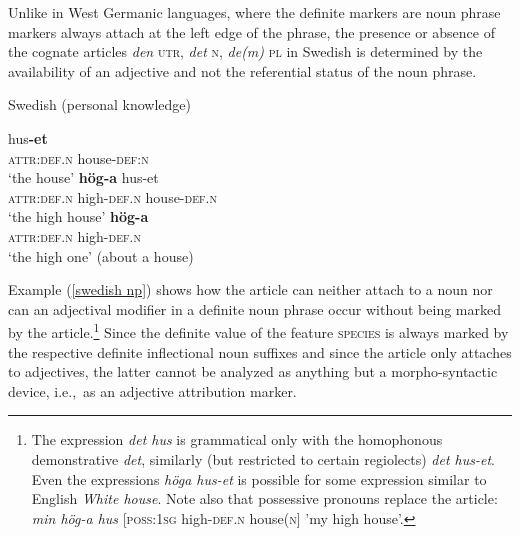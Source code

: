 Unlike in West Germanic languages, where the definite markers are noun phrase markers always attach at the left edge of the phrase, the presence or absence of the cognate articles \textit{den} \textsc{utr}, \textit{det} \textsc{n}, \textit{de(m)} \textsc{pl} in Swedish is determined by the availability of an adjective and not the referential status of the noun phrase. 
\begin{exe}
\label{swedish np}
\ex \rm{Swedish (personal knowledge)}
\begin{xlist}
\ex
{} hus\textbf{-et}\\
	\textsc{attr:def.n} house-\textsc{def:n}\\
\glt	‘the house’
\ex	
{} \textbf{hög-a} hus-et\\
	\textsc{attr:def.n} high-\textsc{def.n} house-\textsc{def.n}\\
\glt	‘the high house’
\label{art0}
\ex 
{} \textbf{hög-a}\\
	\textsc{attr:def.n} high-\textsc{def.n}\\
\glt	‘the high one’ (about a house)
\end{xlist}
\end{exe}
Example (\ref{swedish np}) shows how the article can neither attach to a noun nor can an adjectival modifier in a definite noun phrase occur without being marked by the article.\footnote{The expression \textit{det hus} is grammatical only with the homophonous demonstrative \textit{det}, similarly (but restricted to certain regiolects) \textit{det hus-et}. Even the expressions \textit{höga hus-et} is possible for some expression similar to English \textit{White house}. Note also that possessive pronouns replace the article: \textit{min hög-a hus} [\textsc{poss:1sg} high-\textsc{def.n} house(\textsc{n}] 'my high house’.} Since the definite value of the feature \textsc{species} is always marked by the respective definite inflectional noun suffixes %
 and since the article only attaches to adjectives, the latter cannot be analyzed as anything but a morpho-syntactic device, i.e.,~as an adjective attribution marker.


